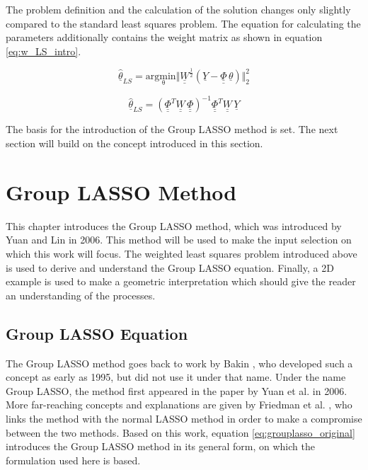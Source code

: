 The problem definition and the calculation of the solution changes only slightly compared to the standard least squares problem. The equation for calculating the parameters additionally contains the weight matrix as shown in equation \ref{eq:w_LS_intro}.

 \begin{equation}
			\hat{\underline{\theta}}_{LS} = \mathrm{arg \underset{\theta} min} \Vert \underline{\underline{W}}^{\frac{1}{2}}(\underline{Y}-\underline{\underline{\Phi}} \, \underline{\theta}) \Vert^2_2 	
	\label{eq:w_LS_intro}
\end{equation}

 \begin{equation}
	\hat{\underline{\theta}}_{LS} = (\underline{\underline{\Phi}}^T\underline{\underline{W}} \, \underline{\underline{\Phi}})^{-1}\underline{\underline{\Phi}}^T \underline{\underline{W}} \, \underline{Y}
	\label{eq:solution_w_LS}
\end{equation}

The basis for the introduction of the Group LASSO method is set. The next section will build on the concept introduced in this section.

\section{Group LASSO Method}
\label{sec:Group_LASSO}

This chapter introduces the Group LASSO method, which was introduced by Yuan and Lin \cite{Yuan_2006} in 2006. This method will be used to make the input selection on which this work will focus. The weighted least squares problem introduced above is used to derive and understand the Group LASSO equation. Finally, a 2D example is used to make a geometric interpretation which should give the reader an understanding of the processes.

\subsection{Group LASSO Equation}
\label{sec:GroupLassoEq}

The Group LASSO method goes back to work by Bakin \cite{Bakin_1995}, who developed such a concept as early as 1995, but did not use it under that name. Under the name Group LASSO, the method first appeared in the paper by Yuan et al. \cite{Yuan_2006} in 2006. More far-reaching concepts and explanations are given by Friedman et al. \cite{Friedman2010}, who links the method with the normal LASSO method in order to make a compromise between the two methods. Based on this work, equation \ref{eq:grouplasso_original} introduces the Group LASSO method in its general form, on which the formulation used here is based.

